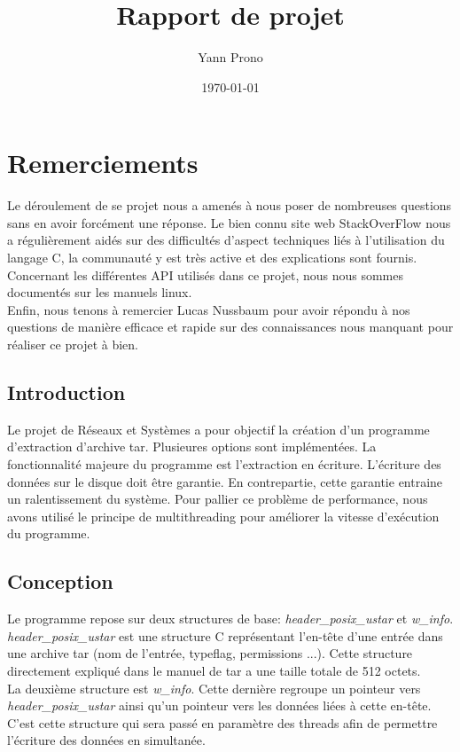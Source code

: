 \documentclass[a4paper,11pt, oneside]{book}
\title{Rapport de projet}
\author{Yann Prono}
\date{\today}
\begin{document}
	\begin{titlepage}
		
	\end{titlepage}

	\newpage
	\newpage\null\thispagestyle{empty}\newpage
	\setcounter{page}{1}

	\chapter{Remerciements}

Le déroulement de se projet nous a amenés à nous poser de nombreuses questions sans en avoir forcément une réponse. Le bien connu site web StackOverFlow nous a régulièrement aidés sur des difficultés d'aspect techniques liés à l'utilisation du langage C, la communauté y est très active et des explications sont fournis. Concernant les différentes API utilisés dans ce projet, nous nous sommes documentés sur les manuels linux.\\

\noindent Enfin, nous tenons à remercier Lucas Nussbaum pour avoir répondu à nos questions de manière efficace et rapide sur des connaissances nous manquant pour réaliser ce projet à bien.

\clearpage

	\section*{Introduction}
	Le projet de Réseaux et Systèmes a pour objectif la création d'un programme d'extraction d'archive tar. Plusieures options  sont implémentées. La fonctionnalité majeure du programme est l'extraction en écriture. L'écriture des données sur le disque doit être garantie. En contrepartie, cette garantie entraine un ralentissement du système. Pour pallier ce problème de performance, nous avons utilisé le principe de multithreading pour améliorer la vitesse d’exécution du programme.


	\section*{Conception}
	Le programme repose sur deux structures de base: \textit{header\_posix\_ustar}
	et \textit{w\_info}.\\
	\noindent
	\textit{header\_posix\_ustar} est une structure C représentant l'en-tête d'une entrée dans une archive tar (nom de l'entrée, typeflag, permissions ...). Cette structure directement expliqué dans le manuel de tar a une taille totale de 512 octets.\\La deuxième structure est \textit{w\_info}. Cette dernière regroupe un pointeur vers \\\textit{header\_posix\_ustar} ainsi qu'un pointeur vers les données liées à cette en-tête. C'est cette structure qui sera passé en paramètre des threads afin de permettre l'écriture des données en simultanée.\\
\end{document}
